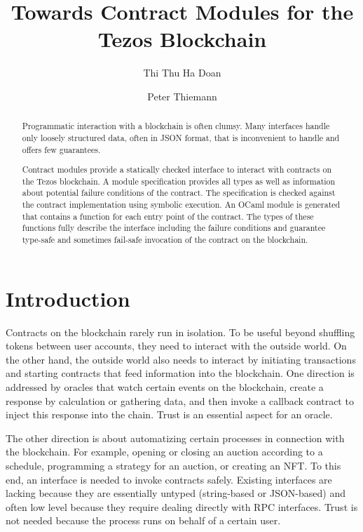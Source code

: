 \documentclass[a4paper,USenglish,american,cleveref, autoref, thm-restate]{oasics-v2021}
\title{Towards Contract Modules for the Tezos Blockchain} %
\author{Thi Thu Ha Doan}{University of Freiburg,
  Germany}{doanha@cs.uni-freiburg.de}{https://orcid.org/0000-0002-1825-0097}{supported
by a grant from the Tezos foundation}%
\author{Peter Thiemann}{University of Freiburg, Germany}{thiemann@acm.org}{https://orcid.org/0000-0002-9000-1239}{}
\begin{document}
\maketitle

\begin{abstract}
  Programmatic interaction with a blockchain is often clumsy.
  Many interfaces handle only loosely structured data, often in JSON
  format, that is inconvenient to handle and offers few guarantees.

  Contract modules provide a statically checked interface to interact
  with contracts on the Tezos blockchain. A module specification
  provides all types as well as information about potential failure
  conditions of the contract. The specification is checked against the
  contract implementation using symbolic execution. An OCaml module is
  generated that contains a function for each entry point of the
  contract. The types of these functions fully describe the interface
  including the failure conditions and guarantee type-safe and
  sometimes fail-safe invocation of the contract on the blockchain.
\end{abstract}

\section{Introduction}
\label{sec:introduction}

Contracts on the blockchain rarely run in isolation. To be useful
beyond shuffling tokens between user accounts, they need to interact
with the outside world. On the other hand, the outside world also
needs to interact by initiating transactions and starting contracts
that feed information into the blockchain. One direction is addressed
by oracles that watch certain events on the blockchain, create a
response by calculation or gathering data, and then invoke a callback
contract to inject this response into the chain. Trust is an essential
aspect for an oracle.

The other direction is about automatizing certain processes in
connection with the blockchain. For example, opening or closing an
auction according to a schedule, programming a strategy for an
auction, or creating an NFT. To this end, an interface is needed to
invoke contracts safely. Existing interfaces are lacking because they
are essentially untyped (string-based or JSON-based) and often low
level because they require dealing directly with RPC interfaces. Trust
is not needed because the process runs on behalf of a certain user.
\end{document}
